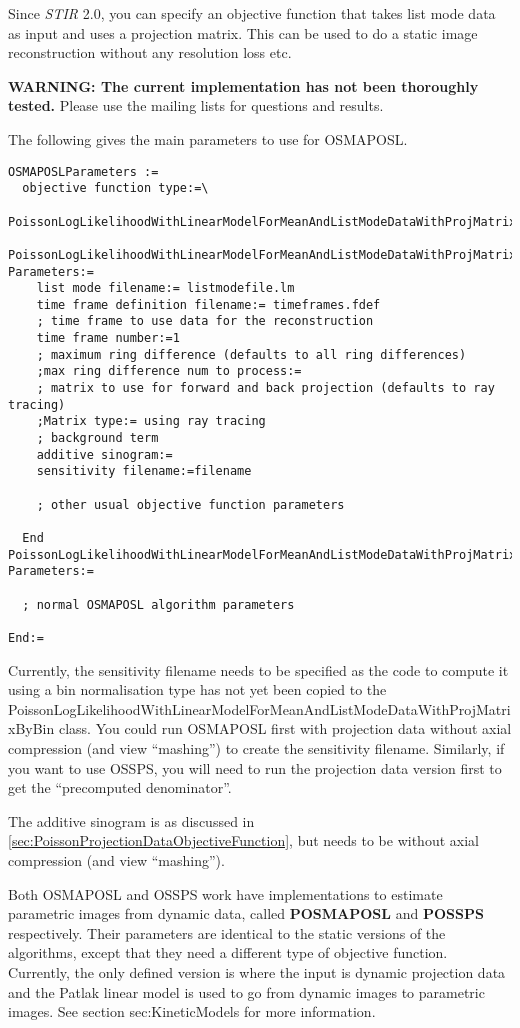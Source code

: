 \documentclass{article}
\begin{document}
{ 
}
\label{sec:ListmodeIterativeAlgorithms}
Since \textit{STIR} 2.0, you can specify an objective function that takes list mode data as input
and uses a projection matrix. This can be used to do a static image reconstruction
without any resolution loss etc. 

\textbf{WARNING: The current implementation has not been thoroughly tested.} Please use
the mailing lists for questions and results.

The following gives the main parameters to use for OSMAPOSL.
\begin{verbatim}
OSMAPOSLParameters :=
  objective function type:=\
     PoissonLogLikelihoodWithLinearModelForMeanAndListModeDataWithProjMatrixByBin
  PoissonLogLikelihoodWithLinearModelForMeanAndListModeDataWithProjMatrixByBin Parameters:=
    list mode filename:= listmodefile.lm
    time frame definition filename:= timeframes.fdef
    ; time frame to use data for the reconstruction
    time frame number:=1
    ; maximum ring difference (defaults to all ring differences)
    ;max ring difference num to process:=
    ; matrix to use for forward and back projection (defaults to ray tracing)
    ;Matrix type:= using ray tracing
    ; background term
    additive sinogram:=
    sensitivity filename:=filename

    ; other usual objective function parameters 

  End PoissonLogLikelihoodWithLinearModelForMeanAndListModeDataWithProjMatrixByBin Parameters:=

  ; normal OSMAPOSL algorithm parameters 

End:=
\end{verbatim}

Currently, the sensitivity filename needs to be specified as the code to compute it using
a bin normalisation type has not yet been copied to the 
PoissonLogLikelihoodWithLinearModelForMeanAndListModeDataWithProjMatrixByBin
class. You could run OSMAPOSL first with projection data without axial compression (and view
``mashing'') to create the sensitivity filename. Similarly, if you want to use OSSPS,
you will need to run the projection data version first to get the ``precomputed denominator''.

The additive sinogram is as discussed in \ref{sec:PoissonProjectionDataObjectiveFunction}, 
but needs to be without axial compression (and view ``mashing'').

{ 
}
\label{sec:ParametricImageIterativeAlgorithms}
Both OSMAPOSL and OSSPS work have implementations to estimate parametric images from
dynamic data, called \textbf{POSMAPOSL} and \textbf{POSSPS} respectively. 
Their parameters are identical to the static versions of the algorithms, except that
they need a different type of objective function. Currently, the only defined version is
where the input is dynamic projection data and the Patlak linear model is used to go from
dynamic images to parametric images. See section {sec:KineticModels} for more information.
\end{document}
